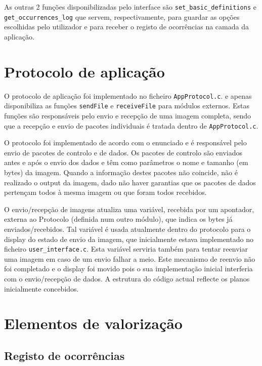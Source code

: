 \documentclass[11pt,a4paper,reqno]{report}
\numberwithin{equation}{section}
\begin{document}
As outras 2 funções disponibilizadas pelo interface são \verb|set_basic_definitions| e \verb|get_occurrences_log| que servem, respectivamente, para guardar as opções escolhidas pelo utilizador e para receber o registo de ocorrências na camada da aplicação.


\chapter{Protocolo de aplicação}

O protocolo de aplicação foi implementado no ficheiro \verb|AppProtocol.c|. e apenas disponibiliza as funções \verb|sendFile| e \verb|receiveFile| para módulos externos. Estas funções são responsáveis pelo envio e recepção de uma imagem completa, sendo que a recepção e envio de pacotes individuais é tratada dentro de \verb|AppProtocol.c|.

O protocolo foi implementado de acordo com o enunciado e é responsável pelo envio de pacotes de controlo e de dados.
Os pacotes de controlo são enviados antes e após o envio dos dados e têm como parâmetros o nome e tamanho (em bytes) da imagem.
Quando a informação destes pacotes não coincide, não é realizado o output da imagem, dado não haver garantias que os pacotes de dados pertençam todos à mesma imagem ou que foram todos recebidos.

O envio/recepção de imagens atualiza uma variável, recebida por um apontador, externa ao Protocolo (definida num outro módulo), que indica os bytes já enviados/recebidos. Tal variável é usada atualmente dentro do protocolo para o display do estado de envio da imagem, que inicialmente estava implementado no ficheiro \verb|user_interface.c|. Esta variável serviria também para tentar reenviar uma imagem em caso de um envio falhar a meio. Este mecanismo de reenvio não foi completado e o display foi movido pois o sua implementação inicial interferia com o envio/recepção de dados. A estrutura do código actual reflecte os planos inicialmente concebidos.

\chapter{Elementos de valorização}

\section{Registo de ocorrências}
\end{document}
